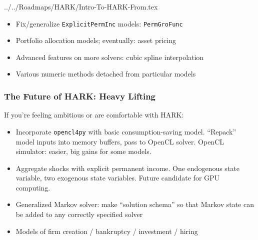 \documentclass[public]{beamer}\beamerdefaultoverlayspecification{<+->}
\begin{document}
\begin{verbatimwrite}{../../Roadmaps/HARK/Intro-To-HARK-From.tex}
\begin{frame}
\begin{itemize}
    \item <2->Fix/generalize \texttt{ExplicitPermInc} models: \texttt{PermGroFunc}

    \item <2->Portfolio allocation models; eventually: asset pricing

    \item <3->Advanced features on more solvers: cubic spline interpolation

    \item <3->Various numeric methods detached from particular models
    \end{itemize}
  \end{frame}


  \begin{frame}
    \frametitle{The Future of HARK: Heavy Lifting}
    If you're feeling ambitious or are comfortable with HARK:
    \begin{itemize}
    \item <1->Incorporate \texttt{opencl4py} with basic consumption-saving model.  ``Repack'' model inputs into memory buffers, pass to OpenCL solver.  OpenCL simulator: easier, big gains for some models.

    \item <2->Aggregate shocks with explicit permanent income.  One endogenous state variable, two exogenous state variables.  Future candidate for GPU computing.

    \item <3->Generalized Markov solver: make ``solution schema'' so that Markov state can be added to any correctly specified solver

    \item <4->Models of firm creation / bankruptcy / investment / hiring
    \end{itemize}

    \hyperlink{DiscussionTopics}{}
  \end{frame}


\end{verbatimwrite}

\end{document}
